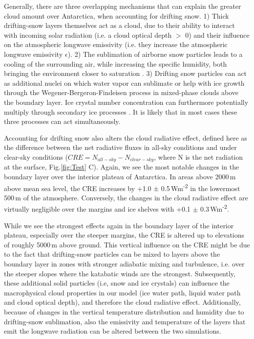 \documentclass[draft]{agujournal2019}
\begin{document}
Generally, there are three overlapping mechanisms that can explain the greater cloud amount over Antarctica, when accounting for drifting snow. 1) Thick drifting-snow layers themselves act as a cloud, due to their ability to interact with incoming solar radiation (i.e. a cloud optical depth $>$ 0) and their influence on the atmospheric longwave emissivity (i.e. they increase the atmospheric longwave emissivity $\epsilon$). 2) The sublimation of airborne snow particles leads to a cooling of the surrounding air, while increasing the specific humidity, both bringing the environment closer to saturation \cite{Amory2019}. 3) Drifting snow particles can act as additional nuclei on which water vapor can sublimate or help with ice growth through the Wegener-Bergeron-Findeisen process in mixed-phase clouds above the boundary layer. Ice crystal number concentration can furthermore potentially multiply through secondary ice processes \cite{Soti2020}. It is likely that in most cases these three processes can act simultaneously. 

Accounting for drifting snow also alters the cloud radiative effect, defined here as the difference between the net radiative fluxes in all-sky conditions and under clear-sky conditions ($CRE= N_{all-sky} - N_{clear-sky}$, where N is the net radiation at the surface, Fig.\ref{fig:Test} C). Again, we see the most notable changes in the boundary layer over the interior plateau of Antarctica. In areas above 2000\,m above mean sea level, the CRE increases by +1.0 $\pm$ 0.5\,Wm\textsuperscript{-2} in the lowermost 500\,m of the atmosphere. Conversely, the changes in the cloud radiative effect are virtually negligible over the margins and ice shelves with +0.1 $\pm$ 0.3\,Wm\textsuperscript{-2}.

While we see the strongest effects again in the boundary layer of the interior plateau, especially over the steeper margins, the CRE is altered up to elevations of roughly 5000\,m above ground. This vertical influence on the CRE might be due to the fact that drifting-snow particles can be mixed to layers above the boundary layer in zones with stronger adiabatic mixing and turbulence, i.e. over the steeper slopes where the katabatic winds are the strongest. Subsequently, these additional solid particles (i.e, snow and ice crystals) can influence the macrophysical cloud properties in our model (ice water path, liquid water path and cloud optical depth), and therefore the cloud radiative effect. Additionally, because of changes in the vertical temperature distribution and humidity due to drifting-snow sublimation, also the emissivity and temperature of the layers that emit the longwave radiation can be altered between the two simulations.
\end{document}
